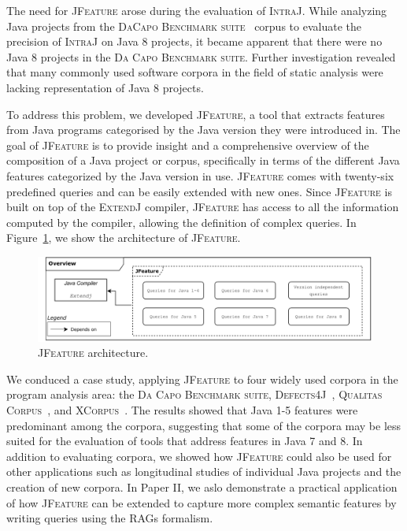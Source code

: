 The need for \textsc{JFeature} arose during the evaluation of \textsc{IntraJ}.
While analyzing Java projects from the \textsc{DaCapo Benchmark suite}~\cite{DaCapo:paper} corpus to evaluate the precision
of \textsc{IntraJ} on Java 8 projects, it became apparent that there were no Java 8 projects
in the \textsc{Da Capo Benchmark suite}. Further investigation revealed that many
commonly used software corpora in the field of static analysis were lacking
representation of Java 8 projects.

To address this problem, we developed \textsc{JFeature}, a tool that extracts features from
Java programs categorised by the Java version they were introduced in.
The goal of \textsc{JFeature} is to provide insight and a comprehensive overview of 
the composition of a Java project or corpus, specifically in terms of the different 
Java features categorized by the Java version in use.
\textsc{JFeature} comes with twenty-six predefined queries and can be easily extended
with new ones. Since \textsc{JFeature} is built on top of the \textsc{ExtendJ} compiler, \textsc{JFeature} has access
to all the information computed by the compiler, allowing the definition of complex 
queries.
In Figure~\ref{fig:JFeature}, we show the architecture of \textsc{JFeature}.
\begin{figure}[H]
  \centering
  \includegraphics[width=1\textwidth]{kappa/img/JFeature.pdf}
  \caption{\label{fig:JFeature} \textsc{JFeature} architecture.}
\end{figure}

We conduced a case study, applying \textsc{JFeature} to four widely used corpora in the
program analysis area: the \textsc{Da Capo Benchmark suite}, \textsc{Defects4J}~\cite{just2014defects4j}, \textsc{Qualitas Corpus}~\cite{QualitasCorpus:APSEC:2010}, and \textsc{XCorpus}~\cite{dietrich2017xcorpus}.
The results showed that Java 1-5 features were predominant among the corpora,
suggesting that some of the corpora may be less suited for the evaluation of 
tools that address features in Java 7 and 8.
In addition to evaluating corpora, we showed how \textsc{JFeature} could also be used for other
applications such as longitudinal studies of individual Java projects and the creation 
of new corpora. In Paper II, we aslo demonstrate a practical application of how \textsc{JFeature} can 
be extended to capture more complex semantic features by writing queries using the RAGs formalism.


